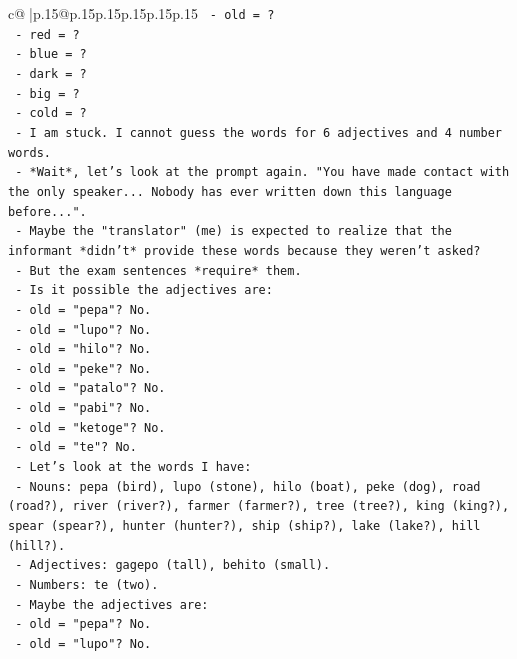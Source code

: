 \documentclass{article}
\begin{document}
{\begin{supertabular}{c@{$\;$}|p{.15\linewidth}@{}p{.15\linewidth}p{.15\linewidth}p{.15\linewidth}p{.15\linewidth}p{.15\linewidth}}
{{{\texttt{        {-} old = ?} \\
\texttt{        {-} red = ?} \\
\texttt{        {-} blue = ?} \\
\texttt{        {-} dark = ?} \\
\texttt{        {-} big = ?} \\
\texttt{        {-} cold = ?} \\
\texttt{      {-} I am stuck. I cannot guess the words for 6 adjectives and 4 number words.} \\
\texttt{      {-} *Wait*, let's look at the prompt again. "You have made contact with the only speaker... Nobody has ever written down this language before...".} \\
\texttt{      {-} Maybe the "translator" (me) is expected to realize that the informant *didn't* provide these words because they weren't asked?} \\
\texttt{      {-} But the exam sentences *require* them.} \\
\texttt{      {-} Is it possible the adjectives are:} \\
\texttt{        {-} old = "pepa"? No.} \\
\texttt{        {-} old = "lupo"? No.} \\
\texttt{        {-} old = "hilo"? No.} \\
\texttt{        {-} old = "peke"? No.} \\
\texttt{        {-} old = "patalo"? No.} \\
\texttt{        {-} old = "pabi"? No.} \\
\texttt{        {-} old = "ketoge"? No.} \\
\texttt{        {-} old = "te"? No.} \\
\texttt{      {-} Let's look at the words I have:} \\
\texttt{        {-} Nouns: pepa (bird), lupo (stone), hilo (boat), peke (dog), road (road?), river (river?), farmer (farmer?), tree (tree?), king (king?), spear (spear?), hunter (hunter?), ship (ship?), lake (lake?), hill (hill?).} \\
\texttt{        {-} Adjectives: gagepo (tall), behito (small).} \\
\texttt{        {-} Numbers: te (two).} \\
\texttt{      {-} Maybe the adjectives are:} \\
\texttt{        {-} old = "pepa"? No.} \\
\texttt{        {-} old = "lupo"? No.} \\
}}}
\end{supertabular}}
\end{document}
